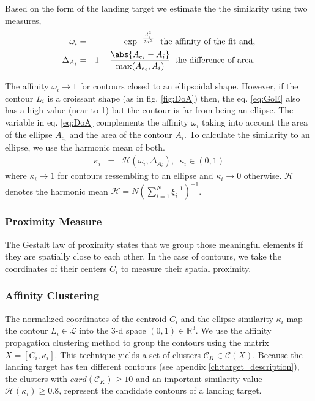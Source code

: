 Based on the form of the landing target we estimate the the similarity using two measures, 
\begin{eqnarray}
\omega_{i}&=&\exp^{-\frac{d_{i}^{2}}{2\sigma^{2}}}\enspace \mbox{the affinity of the fit and,}\label{eq:GoE}\\
\Delta_{A_{i}}&=& 1-\frac{\abs{ A_{e_{i}}-A_{i}}}{\max(A_{e_{i}},A_{i})} \enspace \mbox{the difference of area.}\label{eq:DoA}
\end{eqnarray}

The affinity $\omega_{i}\rightarrow 1$ for contours closed to an ellipsoidal shape. However, if the contour $L_{i}$ is a croissant shape (as in fig. \ref{fig:DoA}) then, the eq. \eqref{eq:GoE} also has a high value (near to 1) but the contour is far from being an ellipse. The variable in eq. \eqref{eq:DoA} complements the affinity $\omega_{i}$ taking into account the area of the ellipse $A_{e_{i}}$ and the area of the contour $A_{i}$. To calculate the similarity to an ellipse, we use the harmonic mean of both. 
\begin{eqnarray}
\kappa_{i}&=&\mathcal{H}(\omega_{i}, \Delta_{A_{i}}), \enspace \kappa_{i}\in (0,1)\label{eq:similarity}
\end{eqnarray}
where $\kappa_{i}\rightarrow 1$ for contours ressembling to an ellipse and $\kappa_{i}\rightarrow 0$ otherwise. $\mathcal{H}$ denotes the harmonic mean $\mathcal{H}= N \left(\sum\limits_{i=1}^{N} \xi_{i}^{-1} \right)^{-1}$.

\subsubsection{Proximity Measure}\label{subsec:proximity}
The Gestalt law of proximity states that we group those meaningful elements if they are spatially close to each other. In the case of contours, we take the coordinates of their centers $C_{i}$ to measure their spatial proximity.

\subsubsection{Affinity Clustering}\label{subsec:clustering}
The normalized coordinates of the centroid $C_i$ and the ellipse similarity $\kappa_i$ map the contour $L_i\in \widetilde{\mathcal{L}}$ into the 3-d space $(0,1) \in \mathbb{R}^3$. We use the affinity propagation clustering method \citep{Frey.Dueck:SCIENCE:2017} to group the contours using the matrix $X=[C_{i}, \kappa_{i}]$. This technique yields a set of clusters $\mathcal{C}_{K}\in \mathcal{C}(X)$. Because the landing target has ten different contours (see apendix \ref{ch:target_description}), the clusters with $card(\mathcal{C}_{K})\geq 10$ and an important similarity value $\mathcal{H}(\kappa_{i})\geq 0.8$, represent the candidate contours of a landing target.

